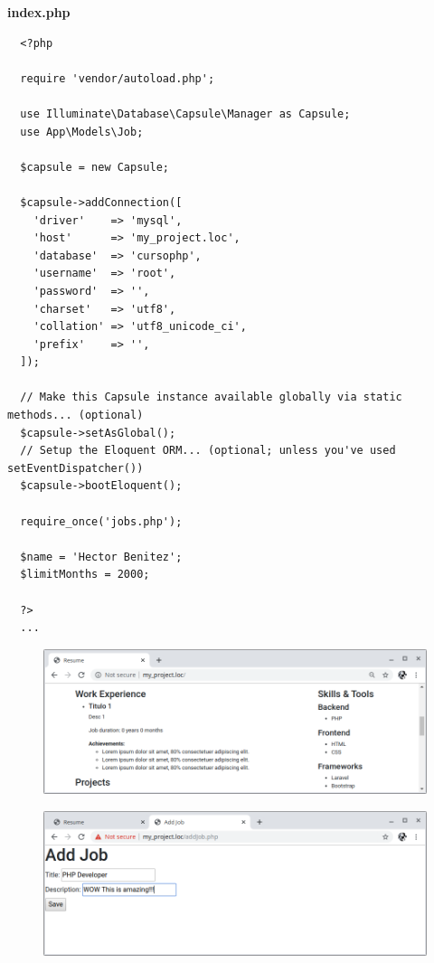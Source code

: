 \documentclass{article}
\begin{document}
\textbf{index.php}
\begin{verbatim}
  <?php

  require 'vendor/autoload.php';

  use Illuminate\Database\Capsule\Manager as Capsule;
  use App\Models\Job;

  $capsule = new Capsule;

  $capsule->addConnection([
    'driver'    => 'mysql',
    'host'      => 'my_project.loc',
    'database'  => 'cursophp',
    'username'  => 'root',
    'password'  => '',
    'charset'   => 'utf8',
    'collation' => 'utf8_unicode_ci',
    'prefix'    => '',
  ]);

  // Make this Capsule instance available globally via static methods... (optional)
  $capsule->setAsGlobal();
  // Setup the Eloquent ORM... (optional; unless you've used setEventDispatcher())
  $capsule->bootEloquent();

  require_once('jobs.php');

  $name = 'Hector Benitez';
  $limitMonths = 2000;

  ?>
  ...
\end{verbatim}

\begin{figure}[h!]
  \centering
  \includegraphics[scale=0.5]{./Pictures/092_listar_bd_job.png}
\end{figure}

\newpage

\begin{figure}[h!]
  \centering
  \includegraphics[scale=0.5]{./Pictures/091_otro_registro.png}
\end{figure}
\end{document}
